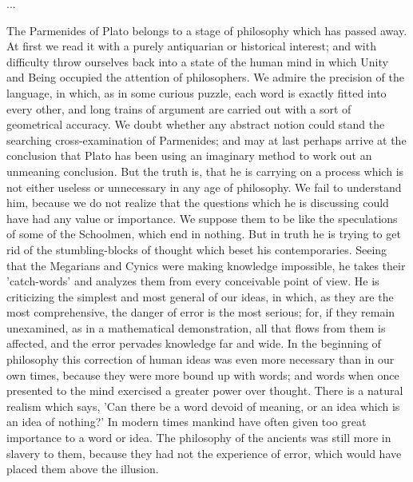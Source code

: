 ...

The Parmenides of Plato belongs to a stage of philosophy which has
passed away. At first we read it with a purely antiquarian or historical
interest; and with difficulty throw ourselves back into a state of
the human mind in which Unity and Being occupied the attention of
philosophers. We admire the precision of the language, in which, as in
some curious puzzle, each word is exactly fitted into every other,
and long trains of argument are carried out with a sort of geometrical
accuracy. We doubt whether any abstract notion could stand the searching
cross-examination of Parmenides; and may at last perhaps arrive at the
conclusion that Plato has been using an imaginary method to work out an
unmeaning conclusion. But the truth is, that he is carrying on a process
which is not either useless or unnecessary in any age of philosophy.
We fail to understand him, because we do not realize that the questions
which he is discussing could have had any value or importance. We
suppose them to be like the speculations of some of the Schoolmen,
which end in nothing. But in truth he is trying to get rid of the
stumbling-blocks of thought which beset his contemporaries. Seeing that
the Megarians and Cynics were making knowledge impossible, he takes
their 'catch-words' and analyzes them from every conceivable point of
view. He is criticizing the simplest and most general of our ideas, in
which, as they are the most comprehensive, the danger of error is the
most serious; for, if they remain unexamined, as in a mathematical
demonstration, all that flows from them is affected, and the error
pervades knowledge far and wide. In the beginning of philosophy this
correction of human ideas was even more necessary than in our own
times, because they were more bound up with words; and words when once
presented to the mind exercised a greater power over thought. There is
a natural realism which says, 'Can there be a word devoid of meaning, or
an idea which is an idea of nothing?' In modern times mankind have often
given too great importance to a word or idea. The philosophy of the
ancients was still more in slavery to them, because they had not the
experience of error, which would have placed them above the illusion.

